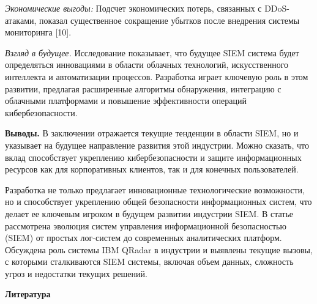 \begin{multicols}{2}
\emph{Экономические выгоды:} Подсчет экономических потерь, связанных с
DDoS-атаками, показал существенное сокращение убытков после внедрения
системы мониторинга {[}10{]}.

\emph{Взгляд в будущее.} Исследование показывает, что будущее SIEM
система будет определяться инновациями в области облачных технологий,
искусственного интеллекта и автоматизации процессов. Разработка играет
ключевую роль в этом развитии, предлагая расширенные алгоритмы
обнаружения, интеграцию с облачными платформами и повышение
эффективности операций кибербезопасности.

{\bfseries Выводы.} В заключении отражается текущие тенденции в области
SIEM, но и указывает на будущее направление развития этой индустрии.
Можно сказать, что вклад способствует укреплению кибербезопасности и
защите информационных ресурсов как для корпоративных клиентов, так и для
конечных пользователей.

Разработка не только предлагает инновационные технологические
возможности, но и способствует укреплению общей безопасности
информационных систем, что делает ее ключевым игроком в будущем развитии
индустрии SIEM. В статье рассмотрена эволюция систем управления
информационной безопасностью (SIEM) от простых лог-систем до современных
аналитических платформ. Обсуждена роль системы IBM QRadar в индустрии и
выявлены текущие вызовы, с которыми сталкиваются SIEM системы, включая
объем данных, сложность угроз и недостатки текущих решений.
\end{multicols}

\begin{center}
{\bfseries Литература}
\end{center}

